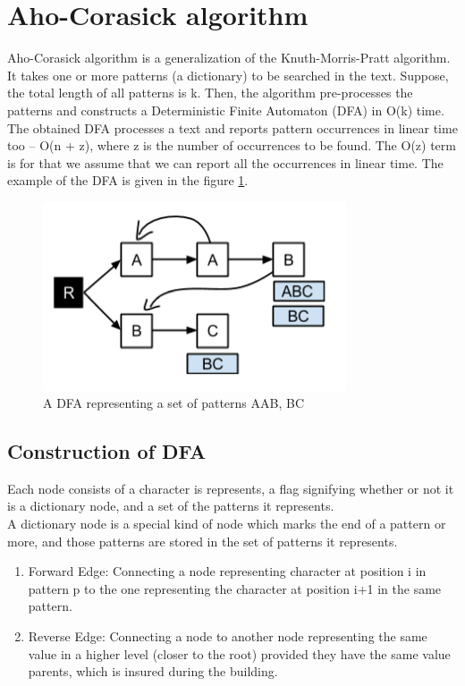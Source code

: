 \documentclass[paper=a4, fontsize=11pt]{scrartcl} %
\numberwithin{equation}{section} %
\numberwithin{figure}{section} %
\numberwithin{table}{section} %
\begin{document}
\newpage

\section{Aho-Corasick algorithm}
Aho-Corasick algorithm \cite{aho} is a generalization of the Knuth-Morris-Pratt algorithm. It takes one or more patterns (a dictionary) to be searched in the text. Suppose, the total length of all patterns is k. Then, the algorithm pre-processes the patterns and constructs a Deterministic Finite Automaton (DFA) \cite{hopcroft} in O(k) time. The obtained DFA processes a text and reports pattern occurrences in linear time too -- O(n + z), where z is the number of occurrences to be found. The O(z) term is for that we assume that we can report all the occurrences in linear time. The example of the DFA is given in the figure \ref{dfa}.

\begin{figure}[h!]
\centering
\includegraphics[width=0.8\textwidth]{figures/Example_DFA.png}
\caption{A DFA representing a set of patterns {AAB, BC}}
\label{dfa}
\end{figure}

\subsection{Construction of DFA}
\label{sec:dfa_const}
Each node consists of a character is represents, a flag signifying whether or not it is a dictionary node, and a set of the patterns it represents.\\
A dictionary node is a special kind of node which marks the end of a pattern or more, and those patterns are stored in the set of patterns it represents. \\

\begin{enumerate}
\item Forward Edge: Connecting a node representing character at position i in pattern p to the one representing the character at position i+1 in the same pattern.
\item Reverse Edge: Connecting a node to another node representing the same value in a higher level (closer to the root) provided they have the same value parents, which is insured during the building.
\end{enumerate}
\end{document}
